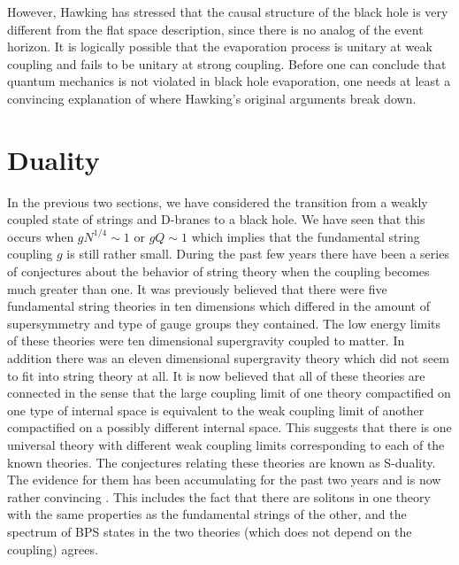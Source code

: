 \documentclass[12pt]{article}
\newcommand{\sect}[1]{\section{#1}\setcounter{equation}{0}}
\begin{document}
However, Hawking has stressed that the causal structure of the black hole
is very different  from the flat space description, since there is no
analog of the event horizon. It is logically possible that the evaporation
process is unitary at weak coupling and fails to be unitary at strong
coupling. Before one can conclude that quantum mechanics is not
violated in  black hole evaporation, one needs at least a convincing
explanation of where Hawking's original arguments break down.


\sect{Duality}

In the previous two sections,
we have considered the transition from a weakly coupled
state of strings and D-branes to a black hole. We have seen that
this occurs when $g N^{1/4}\sim 1$ or $gQ \sim 1$ which implies
that the fundamental
string coupling $g$ is
still rather small. During the past few years there have been a series
of conjectures about the behavior of string theory when the coupling
becomes much greater than one. It was previously believed
that there were five  fundamental
string theories in ten dimensions which differed in the amount of supersymmetry
and type of gauge groups they contained. The low energy limits of these
theories were ten dimensional supergravity coupled to matter.
In addition there was
an eleven dimensional supergravity theory which did not seem to fit into
string theory at all. It is now believed that all of these theories
are connected  in the sense that
the large coupling limit of one theory compactified on one type of internal
space is equivalent to the
weak coupling limit of another compactified on a possibly different
internal space. This suggests that there is one universal theory with different
weak coupling limits corresponding to each of the known theories.
The conjectures relating these theories are known as S-duality. The evidence
for them has been accumulating for the past two years 
and is now rather convincing \cite{pol2}.
This includes the fact that there are solitons in one theory with the
same properties as the fundamental strings of the other, 
and the spectrum
of BPS states in the two theories 
(which does not depend on the coupling) agrees.
\end{document}
